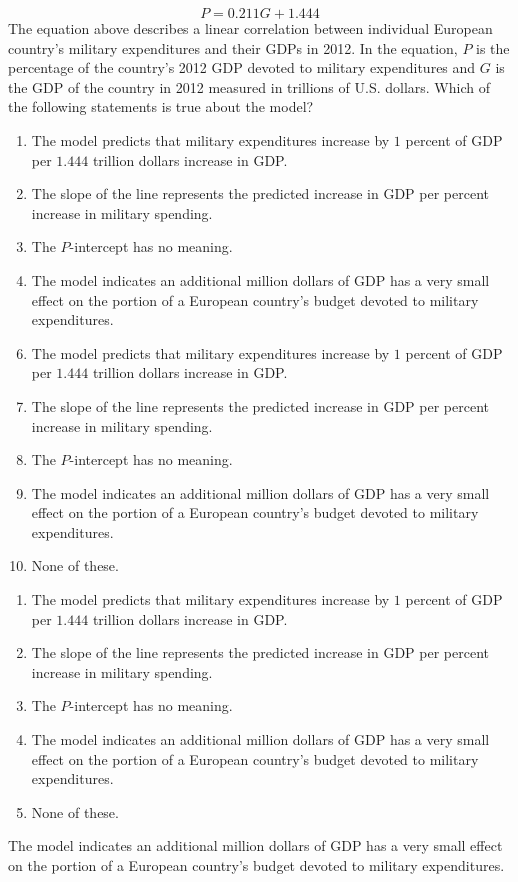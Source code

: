  
$$P=0.211G + 1.444$$
The equation above describes a linear correlation between individual European country's military expenditures and their GDPs in 2012.  In the equation, $P$ is the percentage of the country's 2012 GDP devoted to military expenditures and $G$ is the GDP of the country in 2012 measured in trillions of U.S. dollars.  Which of the following statements is true about the model? 


\ifsat
	\begin{enumerate}[label=\Alph*)]
		\item The model predicts that military expenditures increase by $1$ percent of GDP per $1.444$ trillion dollars increase in GDP.
		\item The slope of the line represents the predicted increase in GDP per percent increase in military spending.
		\item The $P$-intercept has no meaning.
		\item The model indicates an additional million dollars of GDP has a very small effect on the portion of a European country's budget devoted to military expenditures. %
	\end{enumerate}
\else
\fi

\ifacteven
	\begin{enumerate}[label=\textbf{\Alph*.},itemsep=\fill,align=left]
		\setcounter{enumii}{5}
		\item The model predicts that military expenditures increase by $1$ percent of GDP per $1.444$ trillion dollars increase in GDP.
		\item The slope of the line represents the predicted increase in GDP per percent increase in military spending.
		\item The $P$-intercept has no meaning.
		\addtocounter{enumii}{1}
		\item The model indicates an additional million dollars of GDP has a very small effect on the portion of a European country's budget devoted to military expenditures. %
		\item None of these. 
	\end{enumerate}
\else
\fi

\ifactodd
	\begin{enumerate}[label=\textbf{\Alph*.},itemsep=\fill,align=left]
		\item The model predicts that military expenditures increase by $1$ percent of GDP per $1.444$ trillion dollars increase in GDP.
		\item The slope of the line represents the predicted increase in GDP per percent increase in military spending.
		\item The $P$-intercept has no meaning.
		\item The model indicates an additional million dollars of GDP has a very small effect on the portion of a European country's budget devoted to military expenditures. %
		\item None of these. 
	\end{enumerate}
\else
\fi

\ifgridin
 The model indicates an additional million dollars of GDP has a very small effect on the portion of a European country's budget devoted to military expenditures. %

\else
\fi

